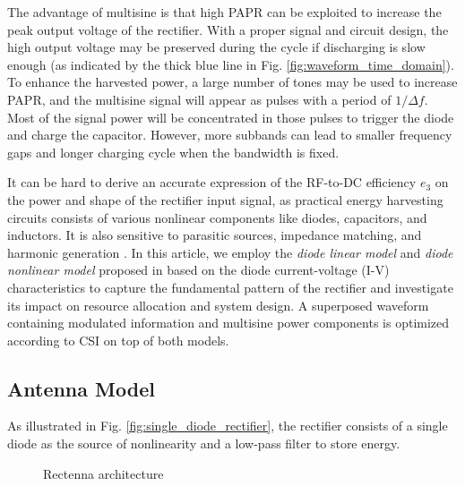 The advantage of multisine is that high PAPR can be exploited to increase the peak output voltage of the rectifier. With a proper signal and circuit design, the high output voltage may be preserved during the cycle if discharging is slow enough (as indicated by the thick blue line in Fig. \ref{fig:waveform_time_domain}). To enhance the harvested power, a large number of tones may be used to increase PAPR, and the multisine signal will appear as pulses with a period of $1/\Delta f$. Most of the signal power will be concentrated in those pulses to trigger the diode and charge the capacitor. However, more subbands can lead to smaller frequency gaps and longer charging cycle when the bandwidth is fixed.

It can be hard to derive an accurate expression of the RF-to-DC efficiency ${e_3}$ on the power and shape of the rectifier input signal, as practical energy harvesting circuits consists of various nonlinear components like diodes, capacitors, and inductors. It is also sensitive to parasitic sources, impedance matching, and harmonic generation \cite{Strassner2013, Valenta2014}. In this article, we employ the \textit{diode linear model} and \textit{diode nonlinear model} proposed in \cite{Clerckx2016} based on the diode current-voltage (I-V) characteristics to capture the fundamental pattern of the rectifier and investigate its impact on resource allocation and system design. A superposed waveform containing modulated information and multisine power components is optimized according to CSI on top of both models.



\subsection{Antenna Model}\label{sec:antenna-model}

As illustrated in Fig. \ref{fig:single_diode_rectifier}, the rectifier consists of a single diode as the source of nonlinearity and a low-pass filter to store energy.

\begin{figure}[ht]
  \centering
  \caption{Rectenna architecture}
  \label{fig:rectenna_architecture}
\end{figure}

